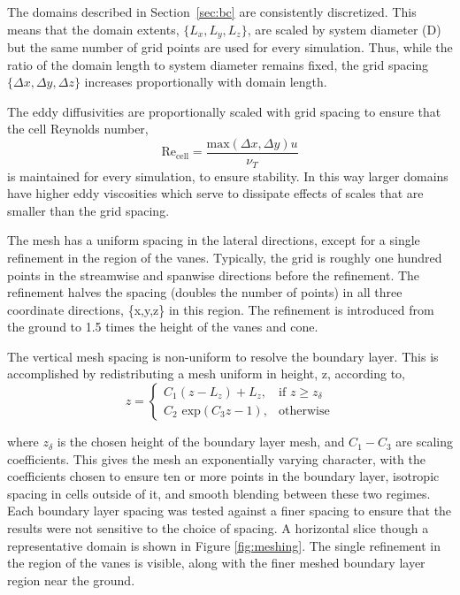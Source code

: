 %
%
The domains described in Section~\ref{sec:bc} are consistently
discretized. This means that the domain extents, $\{L_x,L_y,L_z\}$, are
scaled by system diameter (D) but the same number of grid points are
used for every simulation. Thus, while the ratio of the domain length to
system diameter remains fixed, the grid spacing $\{\Delta x,\Delta
y,\Delta z\}$ increases proportionally with domain length.  

The eddy diffusivities are proportionally scaled with grid spacing to
ensure that the cell Reynolds number, 
\begin{equation}
 \text{Re}_\text{cell} = \frac{\text{max}(\Delta x,\Delta y) u}{\nu_T}
\end{equation} 
is maintained for every simulation, to ensure stability. In this way
 larger domains have higher eddy viscosities which serve to dissipate
 effects of scales that are smaller than the grid spacing. 

The mesh has a uniform spacing in the lateral directions, except for a
single refinement in the region of the vanes. Typically, the grid is 
roughly one hundred points in the streamwise and spanwise directions
before the refinement. The refinement halves the spacing (doubles the
number of points) in all three coordinate directions, \{x,y,z\} in this
region. The refinement is introduced from the ground to 1.5 times the
height of the vanes and cone.

%
%
%
%
%

The vertical mesh spacing is non-uniform to resolve the boundary
layer. This is accomplished by redistributing a 
mesh uniform in height, z, according to,
\begin{equation}
 z = \begin{cases} C_1(z-L_z)+L_z,& \text{if } z \geq z_\delta\\
      C_2 \text{ exp}(C_3 z - 1),                 & \text{otherwise}
     \end{cases}
\end{equation}

where $z_\delta$ is the chosen height of the boundary layer mesh, and
$C_1-C_3$ are scaling coefficients. %
This gives the mesh an exponentially
varying character, with the coefficients chosen to ensure ten or more
points in the boundary layer, isotropic spacing in cells outside of
it, and smooth blending between these two regimes. Each boundary layer
spacing was tested against a finer spacing to ensure that the results
were not sensitive to the choice of spacing. A horizontal slice though a
representative domain is shown in Figure \ref{fig:meshing}. The single
refinement in the region of the vanes is visible, along with the finer
meshed boundary layer region near the ground. 

